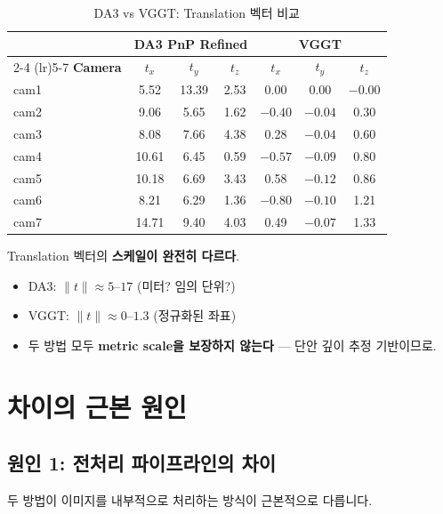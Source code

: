 \documentclass[11pt, a4paper]{report}
\begin{document}
\begin{table}[H]
\centering
\caption{DA3 vs VGGT: Translation 벡터 비교}
\renewcommand{\arraystretch}{1.3}
\begin{tabular}{l ccc ccc}
\toprule
& \multicolumn{3}{c}{\textbf{DA3 PnP Refined}} & \multicolumn{3}{c}{\textbf{VGGT}} \\
\cmidrule(lr){2-4} \cmidrule(lr){5-7}
\textbf{Camera} & $t_x$ & $t_y$ & $t_z$ & $t_x$ & $t_y$ & $t_z$ \\
\midrule
cam1 & 5.52 & 13.39 & 2.53 & 0.00 & 0.00 & $-0.00$ \\
cam2 & 9.06 & 5.65 & 1.62 & $-0.40$ & $-0.04$ & 0.30 \\
cam3 & 8.08 & 7.66 & 4.38 & 0.28 & $-0.04$ & 0.60 \\
cam4 & 10.61 & 6.45 & 0.59 & $-0.57$ & $-0.09$ & 0.80 \\
cam5 & 10.18 & 6.69 & 3.43 & 0.58 & $-0.12$ & 0.86 \\
cam6 & 8.21 & 6.29 & 1.36 & $-0.80$ & $-0.10$ & 1.21 \\
cam7 & 14.71 & 9.40 & 4.03 & 0.49 & $-0.07$ & 1.33 \\
\bottomrule
\end{tabular}
\end{table}

\begin{warningbox}
Translation 벡터의 \textbf{스케일이 완전히 다르다}.
\begin{itemize}[leftmargin=*]
  \item DA3: $\|t\| \approx 5$--$17$ (미터? 임의 단위?)
  \item VGGT: $\|t\| \approx 0$--$1.3$ (정규화된 좌표)
  \item 두 방법 모두 \textbf{metric scale을 보장하지 않는다} --- 단안 깊이 추정 기반이므로.
\end{itemize}
\end{warningbox}


\chapter{차이의 근본 원인}

\section{원인 1: 전처리 파이프라인의 차이}

두 방법이 이미지를 내부적으로 처리하는 방식이 근본적으로 다릅니다.
\end{document}
